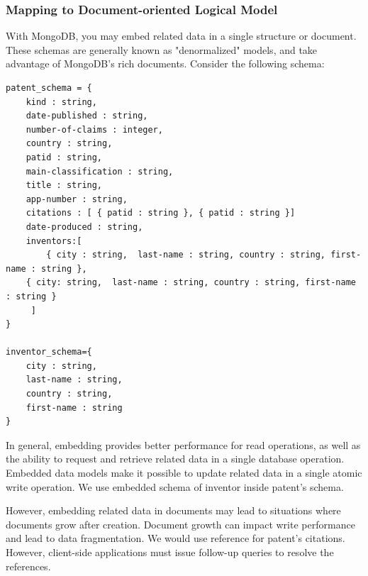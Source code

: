 \documentclass{sig-alternate}
\begin{document}
{\subsubsection{Mapping to Document-oriented Logical Model}
With MongoDB, you may embed related data in a single structure or document. These schemas are generally known as "denormalized" models, and take advantage of MongoDB's rich documents. Consider the following schema:
\begin{lstlisting}[caption=Document-oriented schema]
patent_schema = {
    kind : string, 
    date-published : string, 
    number-of-claims : integer, 
    country : string, 
    patid : string,
    main-classification : string,
    title : string,
    app-number : string, 
    citations : [ { patid : string }, { patid : string }]
    date-produced : string, 
    inventors:[
        { city : string,  last-name : string, country : string, first-name : string },
	{ city: string,  last-name : string, country : string, first-name : string }
     ]       
}

inventor_schema={
    city : string, 
    last-name : string, 
    country : string, 
    first-name : string
}
\end{lstlisting}

In general, embedding provides better performance for read operations, as well as the ability to request and retrieve related data in a single database operation. Embedded data models make it possible to update related data in a single atomic write operation. We use embedded schema of inventor inside patent's schema.

However, embedding related data in documents may lead to situations where documents grow after creation. Document growth can impact write performance and lead to data fragmentation. We would use reference for patent's citations. However, client-side applications must issue follow-up queries to resolve the references. 


}
\end{document}

